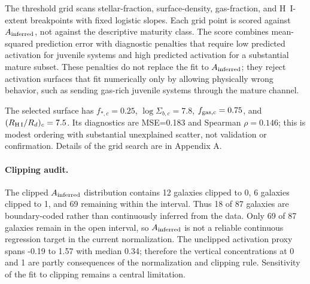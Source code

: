 \documentclass[11pt]{article}
\begin{document}
The threshold grid scans stellar-fraction, surface-density, gas-fraction, and H~I-extent breakpoints with fixed logistic slopes. Each grid point is scored against $A_{\rm inferred}$, not against the descriptive maturity class. The score combines mean-squared prediction error with diagnostic penalties that require low predicted activation for juvenile systems and high predicted activation for a substantial mature subset. These penalties do not replace the fit to $A_{\rm inferred}$; they reject activation surfaces that fit numerically only by allowing physically wrong behavior, such as sending gas-rich juvenile systems through the mature channel.

\begin{table}[H]
\centering
\caption{Selected product-gate maturation model. The MSE and $\rho$ ranges summarize the ten highest-ranked grid points, so the table reports the selected surface without repeating near-identical rows.}
\scriptsize
{}
\end{table}

The selected surface has $f_{*,c}=0.25$, $\log\Sigma_{b,c}=7.8$, $f_{\rm gas,c}=0.75$, and $(R_{\rm H\,I}/R_d)_c=7.5$. Its diagnostics are MSE=0.183 and Spearman $\rho=0.146$; this is modest ordering with substantial unexplained scatter, not validation or confirmation. Details of the grid search are in Appendix A.

\paragraph{Clipping audit.} The clipped $A_{\rm inferred}$ distribution contains 12 galaxies clipped to 0, 6 galaxies clipped to 1, and 69 remaining within the interval. Thus 18 of 87 galaxies are boundary-coded rather than continuously inferred from the data. Only 69 of 87 galaxies remain in the open interval, so $A_{\rm inferred}$ is not a reliable continuous regression target in the current normalization. The unclipped activation proxy spans -0.19 to 1.57 with median 0.34; therefore the vertical concentrations at 0 and 1 are partly consequences of the normalization and clipping rule. Sensitivity of the fit to clipping remains a central limitation.
\end{document}
